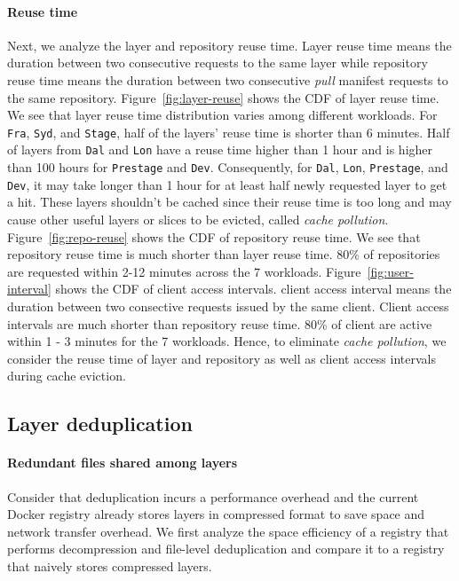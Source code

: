 \paragraph{Reuse time}
Next, we analyze the layer and repository reuse time.
Layer reuse time means the duration between two consecutive requests to the same layer
while repository reuse time means the duration between two consecutive \emph{pull} manifest requests to the same repository.
Figure~\ref{fig:layer-reuse} shows the CDF of layer reuse time. 
We see that layer reuse time distribution varies among different workloads.
For \texttt{Fra}, \texttt{Syd}, and \texttt{Stage},
half of the layers' reuse time is shorter than 6 minutes.
Half of layers from \texttt{Dal} and \texttt{Lon} have a reuse time higher than 1 hour and is higher than 100 hours for \texttt{Prestage} and \texttt{Dev}.
Consequently, for \texttt{Dal}, \texttt{Lon}, \texttt{Prestage}, and \texttt{Dev}, 
it may take longer than 1 hour for at least half newly requested layer to get a hit. 
These layers shouldn't be cached since their reuse time is too long and may cause other useful layers or slices to be evicted, called \emph{cache pollution}.
Figure~\ref{fig:repo-reuse} shows the CDF of repository reuse time.
We see that repository reuse time is much shorter than layer reuse time.
80\% of repositories are requested within 2-12 minutes across the 7 workloads.
Figure~\ref{fig:user-interval} shows the CDF of client access intervals.
client access interval means the duration between two consective requests issued by the same client.
Client access intervals are much shorter than repository reuse time.
80\% of client are active within 1 - 3 minutes for the 7 workloads. 
Hence, to eliminate \emph{cache pollution},
we consider the reuse time of layer and repository as well as client access intervals during cache eviction.

\subsection{Layer deduplication}

\paragraph{Redundant files shared among layers}
Consider that deduplication incurs a performance overhead and the current Docker registry already stores layers in compressed format to save space and network transfer overhead. We first analyze the space efficiency of a registry that performs decompression and file-level deduplication and compare it to a registry that naively stores compressed layers.

